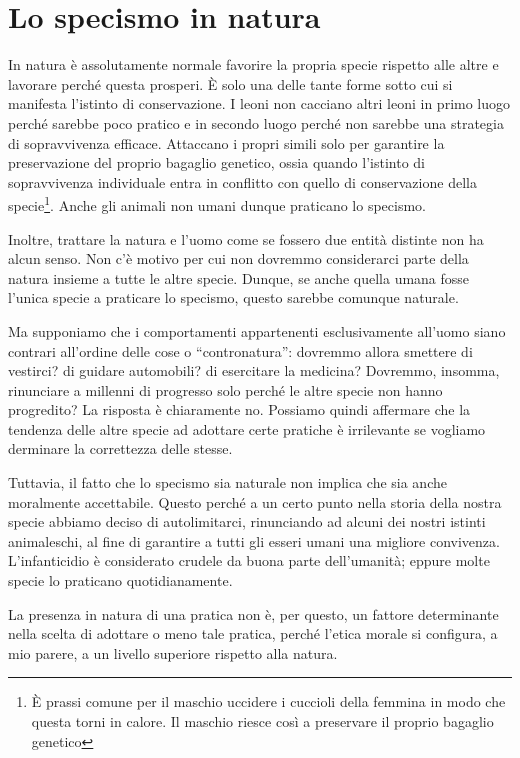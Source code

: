 \documentclass[a4paper,11pt,oneside,article]{memoir}
\begin{document}
\chapter{Lo specismo in natura}

In natura è assolutamente normale favorire la propria specie rispetto alle altre
e lavorare perché questa prosperi. È solo una delle tante forme sotto cui si
manifesta l'istinto di conservazione. I leoni non cacciano altri leoni in primo
luogo perché sarebbe poco pratico e in secondo luogo perché non sarebbe una
strategia di sopravvivenza efficace. Attaccano i propri simili solo per
garantire la preservazione del proprio bagaglio genetico, ossia quando l'istinto
di sopravvivenza individuale entra in conflitto con quello di conservazione
della specie\footnote{È prassi comune per il maschio uccidere i cuccioli della
femmina in modo che questa torni in calore. Il maschio riesce così a preservare
il proprio bagaglio genetico}. Anche gli animali non umani dunque praticano lo
specismo.

Inoltre, trattare la natura e l'uomo come se fossero due entità distinte non ha
alcun senso. Non c'è motivo per cui non dovremmo considerarci parte della natura
insieme a tutte le altre specie. Dunque, se anche quella umana fosse l'unica
specie a praticare lo specismo, questo sarebbe comunque naturale.

Ma supponiamo che i comportamenti appartenenti esclusivamente all'uomo siano
contrari all'ordine delle cose o ``contronatura'': dovremmo allora smettere di
vestirci? di guidare automobili? di esercitare la medicina? Dovremmo, insomma,
rinunciare a millenni di progresso solo perché le altre specie non hanno
progredito? La risposta è chiaramente no. Possiamo quindi affermare che la
tendenza delle altre specie ad adottare certe pratiche è irrilevante se vogliamo
derminare la correttezza delle stesse.

Tuttavia, il fatto che lo specismo sia naturale non implica che sia anche
moralmente accettabile. Questo perché a un certo punto nella storia della nostra
specie abbiamo deciso di autolimitarci, rinunciando ad alcuni dei nostri istinti
animaleschi, al fine di garantire a tutti gli esseri umani una migliore
convivenza. L'infanticidio è considerato crudele da buona parte dell'umanità;
eppure molte specie lo praticano quotidianamente.

La presenza in natura di una pratica non è, per questo, un fattore determinante
nella scelta di adottare o meno tale pratica, perché l'etica morale si
configura, a mio parere, a un livello superiore rispetto alla natura.
\end{document}
